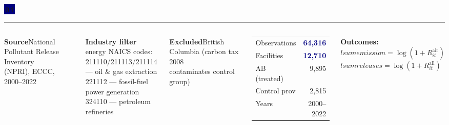 \documentclass[aspectratio=169,12pt]{beamer}
\newcommand{\badge}[2][Navy]{%
  \colorbox{#1}{\color{white}\,\textbf{\small #2}\,}%
}
\newcommand{\hi}[1]{\textcolor{Navy}{\textbf{#1}}}
\begin{document}
\begin{frame}
\badge{04}
\vspace{0.5em}\par
{\color{Blue}\rule{\linewidth}{0.8pt}}\par
\vspace{0.4em}

\begin{columns}[T]
\textbf{Source}\quad National Pollutant Release Inventory\\
\quad\quad\quad\quad\;\; (NPRI), ECCC, 2000--2022

\vspace{0.5em}
\textbf{Industry filter} energy NAICS codes:\\
{\small 211110/211113/211114 — oil \& gas extraction\\
221112 — fossil-fuel power generation\\
324110 — petroleum refineries}

\vspace{0.5em}
\textbf{Excluded}\quad British Columbia (carbon tax 2008\\
\quad\quad\quad\quad\;\; contaminates control group)

\begin{tcolorbox}[resultbox,title={\small Sample}]
\begin{tabular}{lr}
Observations & \hi{64,316} \\
Facilities   & \hi{12,710} \\
AB (treated) & 9,895 \\
Control prov & 2,815 \\
Years        & 2000--2022 \\
\end{tabular}
\end{tcolorbox}

\vspace{0.4em}
{\small \textbf{Outcomes:}\\
$\mathit{lsumemission} = \log(1 + R^{\text{air}}_{it})$\\
$\mathit{lsumreleases} = \log(1 + R^{\text{all}}_{it})$}
\end{columns}
\end{frame}
\end{document}
